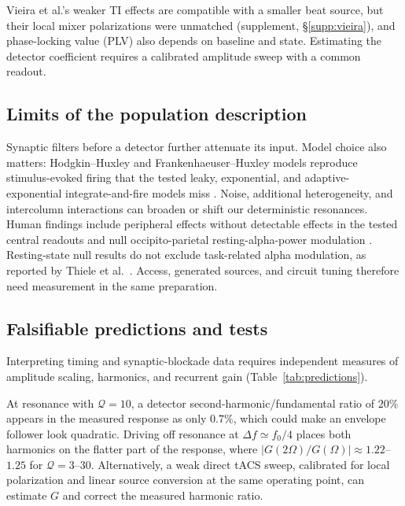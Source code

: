 \documentclass[a4paper]{article}
\begin{document}
Vieira et al.'s weaker TI effects \cite{vieira2024} are compatible with a smaller
beat source, but their local mixer polarizations were unmatched (supplement,
\S\ref{supp:vieira}), and phase-locking value (PLV) also depends on baseline and
state. Estimating the detector coefficient requires a calibrated amplitude sweep
with a common readout.

\subsection{Limits of the population description}
Synaptic filters before a detector further attenuate its input. Model choice
also matters: Hodgkin--Huxley and Frankenhaeuser--Huxley models reproduce
stimulus-evoked firing that the tested leaky, exponential, and adaptive-exponential
integrate-and-fire models miss \cite{plovie2025}. Noise, additional heterogeneity,
and intercolumn interactions can broaden or shift our deterministic resonances.
Human findings include peripheral effects without detectable effects in the tested
central readouts \cite{iszak2023} and null occipito-parietal resting-alpha-power
modulation \cite{mansourinezhad2025}. Resting-state null results do not exclude
task-related alpha modulation, as reported by Thiele et al.\ \cite{thiele2024ttis}.
Access, generated sources, and circuit tuning therefore need measurement in the
same preparation.

\subsection{Falsifiable predictions and tests}\label{sec:predictions}
Interpreting timing and synaptic-blockade data requires independent measures of
amplitude scaling, harmonics, and recurrent gain (Table~\ref{tab:predictions}).

At resonance with
$\mathcal Q=10$, a detector second-harmonic/fundamental ratio of $20\%$ appears in
the measured response as only $0.7\%$, which could make an envelope follower look
quadratic. Driving off resonance at $\Delta f\simeq f_0/4$ places both harmonics on
the flatter part of the response, where $|G(2\Omega)/G(\Omega)|\approx1.22$--$1.25$
for $\mathcal Q=3$--$30$. Alternatively, a weak direct tACS sweep, calibrated for
local polarization and linear source conversion at the same operating point,
can estimate $G$ and correct the measured harmonic ratio.
\end{document}
